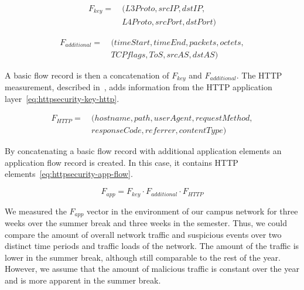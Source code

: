 \begin{equation} \label{eq:httpsecurity-flow-key}
    \begin{split}
        F_{key} =\ &(L3Proto, srcIP, dstIP, \\
        & L4Proto, srcPort, dstPort)
    \end{split}
\end{equation}

\begin{equation} \label{eq:httpsecurity-flow-additional}
    \begin{split}
        F_{additional} =\ &(timeStart, timeEnd, packets, octets, \\
        & TCPflags, ToS, srcAS, dstAS )
    \end{split}
\end{equation}

A basic flow record is then a concatenation of $F_{key}$ and $F_{additional}$. The HTTP measurement, described in~\cite{Velan-2013-Design}, adds information from the HTTP application layer~\eqref{eq:httpsecurity-key-http}. 

\begin{equation} \label{eq:httpsecurity-key-http}
    \begin{split}
        F_{HTTP} =\ &(hostname, path, userAgent, requestMethod, \\
        & responseCode, referrer, contentType )
    \end{split}
\end{equation}

By concatenating a basic flow record with additional application elements an application flow record is created. In this case, it contains HTTP elements~\eqref{eq:httpsecurity-app-flow}.

\begin{equation} \label{eq:httpsecurity-app-flow}
        F_{app} = F_{key} \cdot F_{additional} \cdot F_{HTTP}
\end{equation}

We measured the $F_{app}$ vector in the environment of our campus network for three weeks over the summer break and three weeks in the semester. Thus, we could compare the amount of overall network traffic and suspicious events over two distinct time periods and traffic loads of the network. The amount of the traffic is lower in the summer break, although still comparable to the rest of the year. However, we assume that the amount of malicious traffic is constant over the year and is more apparent in the summer break.

